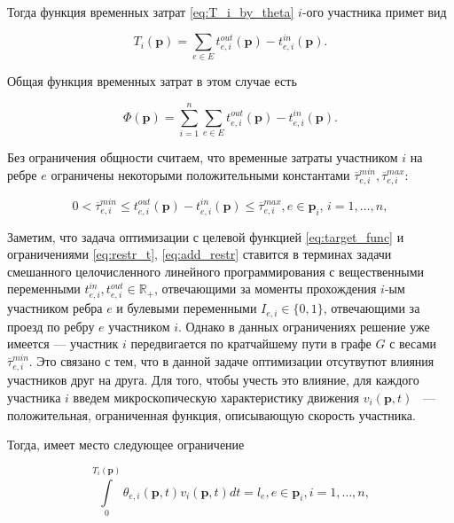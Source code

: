 \documentclass[12pt, a4paper]{article}
\begin{document}
Тогда функция временных затрат \eqref{eq:T_i_by_theta} $i$-ого участника примет вид

\begin{equation}
	\label{eq:T_i_by_t}
	T_i(\textbf{p}) = \sum \limits_{e \in E} t_{e, i}^{out}(\textbf{p}) - t_{e, i}^{in}(\textbf{p}).
\end{equation}

Общая функция временных затрат в этом случае есть 

\begin{equation}
	\label{eq:target_func}
	\Phi(\textbf{p}) =\sum \limits_{i = 1}^n \sum \limits_{e \in E} t_{e, i}^{out}(\textbf{p}) - t_{e, i}^{in}(\textbf{p}).
\end{equation}

Без ограничения общности считаем, что временные затраты участником $i$ на ребре $e$ ограничены некоторыми положительными константами $\overline{\tau}_{e, i}^{min}, \overline{\tau}_{e, i}^{max}$:

\begin{equation}
	\label{eq:add_restr}
		0 < \overline{\tau}_{e, i}^{min} \le t_{e, i}^{out}(\textbf{p}) - t_{e, i}^{in}(\textbf{p}) \le \overline{\tau}_{e, i}^{max}, e \in \textbf{p}_i,\, i = 1, \dots, n,
\end{equation}

Заметим, что задача оптимизации с целевой функцией \eqref{eq:target_func} и ограничениями \eqref{eq:restr_t}, \eqref{eq:add_restr} ставится в терминах задачи смешанного целочисленного линейного программирования с вещественными переменными $t_{e, i}^{in}, t_{e, i}^{out} \in \mathbb{R}_+$, отвечающими за моменты прохождения $i$-ым участником ребра $e$ и булевыми переменными $I_{e, i} \in \{0, 1\}$, отвечающими за проезд по ребру $e$ участником $i$. Однако в данных ограничениях решение уже имеется --- участник $i$ передвигается по кратчайшему пути в графе $G$ с весами $\overline{\tau}_{e, i}^{min}$. Это связано с тем, что в данной задаче оптимизации отсутвутют влияния участников друг на друга. Для того, чтобы учесть это влияние, для каждого участника $i$ введем микроскопическую характеристику движения $v_i(\textbf{p}, t)$ ~--- положительная, ограниченная функция, описывающую скорость участника.


Тогда, имеет место следующее ограничение

\begin{equation}
	\label{eq:velocity_eq_by_theta}
	\int\limits_{0}^{T_i(\textbf{p})} \theta_{e, i} (\textbf{p}, t) v_i(\textbf{p}, t) dt = l_e, e \in \textbf{p}_i, i = 1, \dots, n,
\end{equation}
\end{document}
